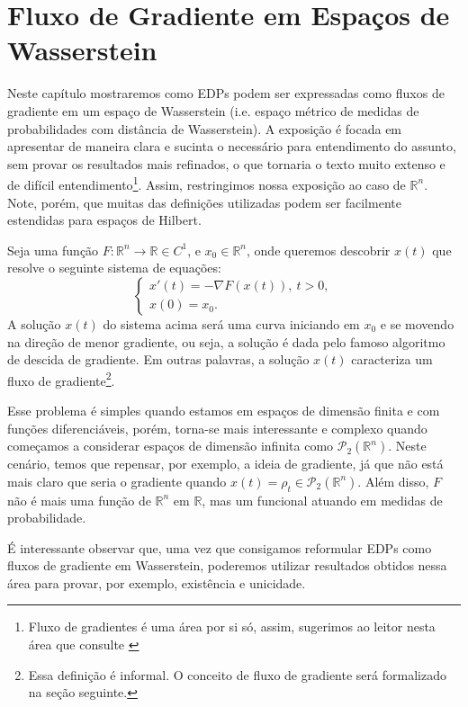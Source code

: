 \newpage
\chapter{Fluxo de Gradiente em Espaços de Wasserstein}

Neste capítulo mostraremos como EDPs podem ser expressadas como
fluxos de gradiente em um espaço de Wasserstein
(i.e. espaço métrico de medidas de probabilidades com distância de Wasserstein). A exposição é
focada em apresentar de maneira clara e sucinta o necessário para entendimento
do assunto, sem provar os resultados mais refinados, o que tornaria o
texto muito extenso e de difícil
entendimento\footnote{Fluxo de gradientes é uma área por si só, assim, sugerimos ao leitor nesta área
que consulte \citet{ambrosio2008gradient}}. Assim, restringimos
nossa exposição ao caso de $\mathbb R^n$. Note, porém, que muitas das definições
utilizadas podem ser facilmente estendidas para espaços de Hilbert.

Seja uma função $F:\mathbb R^n \to \mathbb R \in C^1$, e $x_0 \in \mathbb R^n$,
onde queremos descobrir $x(t)$ que resolve o seguinte sistema de equações:
\begin{equation}
    \begin{cases}
        x'(t) = -\nabla F(x(t)), \ t>0,\\
        x(0)  = x_0.
    \end{cases}
\end{equation}
A solução $x(t)$ do sistema acima será uma curva iniciando em $x_0$ e se movendo
na direção de menor gradiente, ou seja, a solução é dada
pelo famoso algoritmo de descida de gradiente. Em outras palavras,
a solução $x(t)$ caracteriza um fluxo de gradiente\footnote{Essa definição é informal. O conceito
de fluxo de gradiente será formalizado na seção seguinte.}.

Esse problema é simples quando estamos em espaços de dimensão finita e com
funções diferenciáveis, porém, torna-se mais
interessante e complexo quando começamos a considerar espaços de dimensão infinita
como $\mathcal P_2(\mathbb R^n)$. Neste cenário, temos que repensar, por exemplo,
a ideia de gradiente, já que não está mais claro que seria o gradiente quando
$x(t) = \rho_t \in \mathcal P_2(\mathbb R^n)$. Além disso, $F$ não é mais uma
função de $\mathbb R^n$ em $\mathbb R$, mas um funcional atuando em medidas
de probabilidade.

É interessante observar que, uma vez que consigamos reformular EDPs
como fluxos de gradiente em Wasserstein, poderemos utilizar resultados
obtidos nessa área para provar, por exemplo, existência e unicidade.

